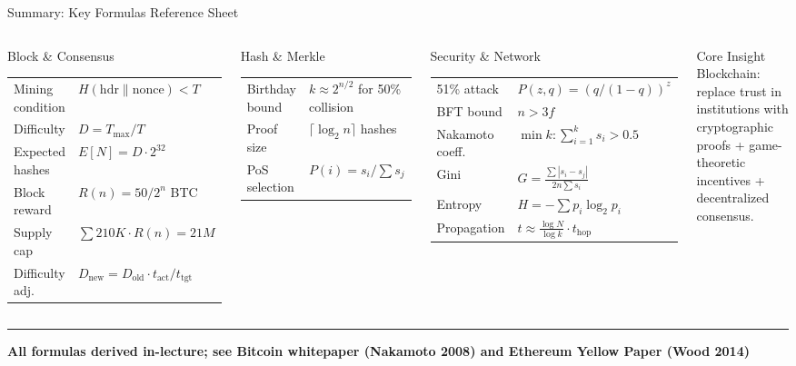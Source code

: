 \documentclass[8pt,aspectratio=169]{beamer}
\newcommand{\bottomnote}[1]{\vfill\vspace{-2mm}\textcolor{mllavender2}{\rule{\textwidth}{0.4pt}}\vspace{1mm}\footnotesize\textbf{#1}}
\begin{document}
\begin{frame}{Summary: Key Formulas Reference Sheet}
\begin{columns}
\begin{block}{Block \& Consensus}
\begin{tabular}{ll}
\toprule
Mining condition & $H(\text{hdr}\|\text{nonce})<T$\\
Difficulty & $D=T_{\max}/T$\\
Expected hashes & $E[N]=D\cdot 2^{32}$\\
Block reward & $R(n)=50/2^n$ BTC\\
Supply cap & $\sum 210K\cdot R(n)=21M$\\
Difficulty adj. & $D_{\text{new}}=D_{\text{old}}\cdot t_{\text{act}}/t_{\text{tgt}}$\\
\bottomrule
\end{tabular}
\end{block}
\vspace{2mm}
\begin{block}{Hash \& Merkle}
\begin{tabular}{ll}
\toprule
Birthday bound & $k\approx 2^{n/2}$ for 50\% collision\\
Proof size & $\lceil\log_2 n\rceil$ hashes\\
PoS selection & $P(i)=s_i/\sum s_j$\\
\bottomrule
\end{tabular}
\end{block}
\begin{block}{Security \& Network}
\begin{tabular}{ll}
\toprule
51\% attack & $P(z,q)=(q/(1-q))^z$\\
BFT bound & $n>3f$\\
Nakamoto coeff. & $\min k:\sum_{i=1}^k s_i>0.5$\\
Gini & $G=\frac{\sum|s_i-s_j|}{2n\sum s_i}$\\
Entropy & $H=-\sum p_i\log_2 p_i$\\
Propagation & $t\approx\frac{\log N}{\log k}\cdot t_{\text{hop}}$\\
\bottomrule
\end{tabular}
\end{block}
\vspace{2mm}
\begin{alertblock}{Core Insight}
\small Blockchain: replace trust in institutions with cryptographic proofs + game-theoretic incentives + decentralized consensus.
\end{alertblock}
\end{columns}
\bottomnote{All formulas derived in-lecture; see Bitcoin whitepaper (Nakamoto 2008) and Ethereum Yellow Paper (Wood 2014)}
\end{frame}
\end{document}
